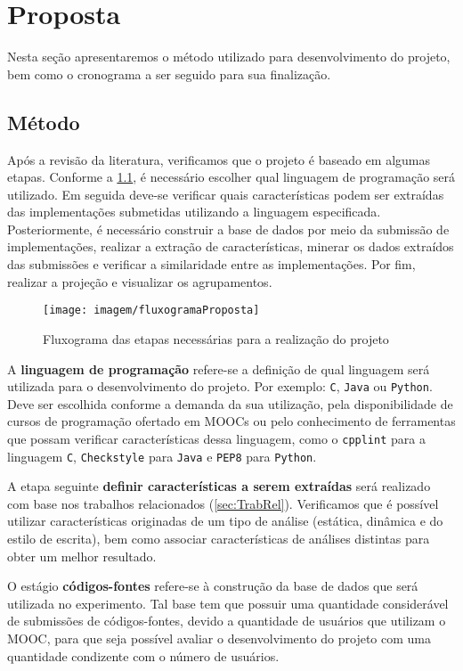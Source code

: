 \chapter{Proposta}
\label{chap:Proposta}

	Nesta seção apresentaremos o método utilizado para desenvolvimento do projeto, bem
	como o cronograma a ser seguido para sua finalização.

	\section{Método}
	Após a revisão da literatura, verificamos que o projeto é baseado em algumas etapas.
	Conforme a \cref{fig:fluxogramaProposta}, é necessário escolher qual linguagem de programação
	será utilizado. Em seguida deve-se verificar quais características podem ser extraídas
	das implementações submetidas utilizando a linguagem especificada. Posteriormente, é
	necessário construir a base de dados por meio da submissão de implementações, realizar
	a extração de características, minerar os dados extraídos das submissões e verificar a
	similaridade entre as implementações. Por fim, realizar a projeção e visualizar os
	agrupamentos.

	\begin{figure}[h]
		\centering
		\texttt{[image: imagem/fluxogramaProposta]}
		\caption{Fluxograma das etapas necessárias para a realização do projeto}
		\label{fig:fluxogramaProposta}
	\end{figure}

	A \textbf{linguagem de programação} refere-se a definição de qual linguagem será
	utilizada para o desenvolvimento do projeto. Por exemplo: \texttt{C}, \texttt{Java}
	ou \texttt{Python}. Deve ser escolhida conforme a demanda da sua utilização, pela
	disponibilidade de cursos de programação ofertado em MOOCs ou pelo conhecimento de
	ferramentas que possam verificar características dessa linguagem, como o
	\texttt{cpplint} para a linguagem \texttt{C}, \texttt{Checkstyle} para
	\texttt{Java} e \texttt{PEP8} para \texttt{Python}.

	A etapa seguinte \textbf{definir características a serem extraídas} será realizado
	com base nos trabalhos relacionados (\cref{sec:TrabRel}). Verificamos que é
	possível utilizar características originadas de um tipo de análise (estática,
	dinâmica e do estilo de escrita), bem como associar características de análises
	distintas para obter um melhor resultado.
	
	O estágio \textbf{códigos-fontes} refere-se à construção da base de dados que será
	utilizada no experimento. Tal base tem que possuir uma quantidade considerável de
	submissões de códigos-fontes, devido a quantidade de usuários que utilizam o MOOC,
	para que seja possível avaliar o desenvolvimento do projeto com uma quantidade
	condizente com o número de usuários.
	
